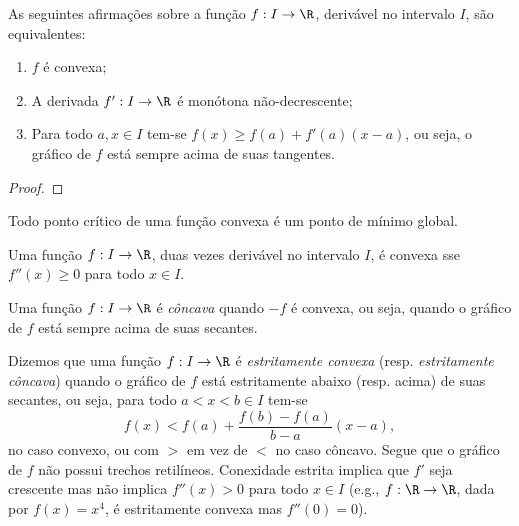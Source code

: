 \documentclass{article}
\begin{document}
\begin{thm} As seguintes afirmações sobre a função \(f: I \to \R\), derivável no intervalo \(I\), são equivalentes:
    \begin{enumerate}
        \item [(1)] \(f\) é convexa;
        \item [(2)] A derivada \(f' : I \to \R\) é monótona não-decrescente;
        \item [(3)] Para todo \(a, x \in I\) tem-se \(f(x) \geq f(a) + f'(a)(x-a)\), ou seja, o gráfico de \(f\) está sempre acima de suas tangentes.
    \end{enumerate}
\end{thm}

\begin{proof}
    
\end{proof}

\begin{cor}
    Todo ponto crítico de uma função convexa é um ponto de mínimo global.
\end{cor}

\begin{cor}
    Uma função \(f: I \to \R\), duas vezes derivável no intervalo \(I\), é convexa sse \(f''(x) \geq 0\) para todo \(x \in I\).
\end{cor}

\begin{defn}
    Uma função \(f: I \to \R\) é \emph{côncava} quando \(-f\) é convexa, ou seja, quando o gráfico de \(f\) está sempre acima de suas secantes.
\end{defn}

\begin{defn}
    Dizemos que uma função \(f: I \to \R\) é \emph{estritamente convexa} (resp. \emph{estritamente côncava}) quando o gráfico de \(f\) está estritamente abaixo (resp. acima) de suas secantes, ou seja, para todo \(a<x<b \in I\) tem-se
    \[
        f(x) < f(a) + \frac{f(b)-f(a)}{b-a} (x-a),
    \]
    no caso convexo, ou com \(>\) em vez de \(<\) no caso côncavo. Segue que o gráfico de \(f\) não possui trechos retilíneos. Conexidade estrita implica que \(f'\) seja crescente mas não implica \(f''(x)>0\) para todo \(x \in I\) (e.g., \(f: \R \to \R\), dada por \(f(x) = x^4\), é estritamente convexa mas \(f''(0)=0\)).
\end{defn}
\end{document}
